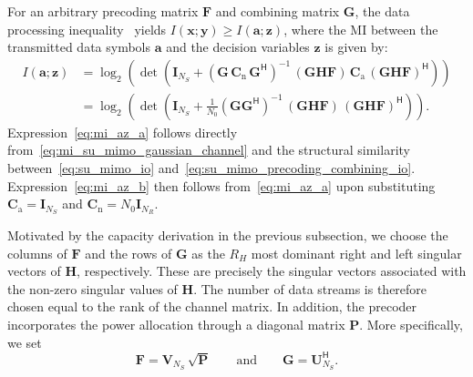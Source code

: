 For an arbitrary precoding matrix $\mathbf{F}$ and combining matrix $\mathbf{G}$, the data processing inequality~\cite{cover_thomas_2005} yields $I(\mathbf{x}; \mathbf{y}) \geq I(\mathbf{a}; \mathbf{z})$, where the \ac{MI} between the transmitted data symbols $\mathbf{a}$ and the decision variables $\mathbf{z}$ is given by:
\begin{subequations}
\label{eq:mi_az}
\begin{align}
    I(\mathbf{a}; \mathbf{z}) 
    &= \log_2\!\left(\det\!\left(\mathbf{I}_{N_S} + (\mathbf{G} \, \mathbf{C}_{\mathrm{n}} \, \mathbf{G}^{\mathsf{H}})^{-1} \, (\mathbf{G} \mathbf{H} \mathbf{F}) \, \mathbf{C}_{\mathrm{a}} \, (\mathbf{G} \mathbf{H} \mathbf{F})^{\mathsf{H}}\right)\right) \label{eq:mi_az_a} \\
    &= \log_2\!\left(\det\!\left(\mathbf{I}_{N_S} + \tfrac{1}{N_0}(\mathbf{G} \mathbf{G}^{\mathsf{H}})^{-1} \, (\mathbf{G} \mathbf{H} \mathbf{F}) \, (\mathbf{G} \mathbf{H} \mathbf{F})^{\mathsf{H}}\right)\right) \label{eq:mi_az_b}.
\end{align}
\end{subequations}
Expression~\eqref{eq:mi_az_a} follows directly from~\eqref{eq:mi_su_mimo_gaussian_channel} and the structural similarity between~\eqref{eq:su_mimo_io} and~\eqref{eq:su_mimo_precoding_combining_io}.
Expression~\eqref{eq:mi_az_b} then follows from~\eqref{eq:mi_az_a} upon substituting $\mathbf{C}_{\mathrm{a}} = \mathbf{I}_{N_S}$ and $\mathbf{C}_{\mathrm{n}} = N_0 \mathbf{I}_{N_R}$.

Motivated by the capacity derivation in the previous subsection, we choose the columns of $\mathbf{F}$ and the rows of $\mathbf{G}$ as the $R_H$ most dominant right and left singular vectors of $\mathbf{H}$, respectively.
These are precisely the singular vectors associated with the non-zero singular values of $\mathbf{H}$. The number of data streams is therefore chosen equal to the rank of the channel matrix.
In addition, the precoder incorporates the power allocation through a diagonal matrix $\mathbf{P}$.
More specifically, we set
\begin{equation}
\label{eq:su_mimo_optimal_precoder_and_combiner}
    \mathbf{F} = \mathbf{V}_{N_S} \, \sqrt{\mathbf{P}} \qquad \text{and} \qquad \mathbf{G} = \mathbf{U}_{N_S}^{\mathsf{H}}.
\end{equation}

